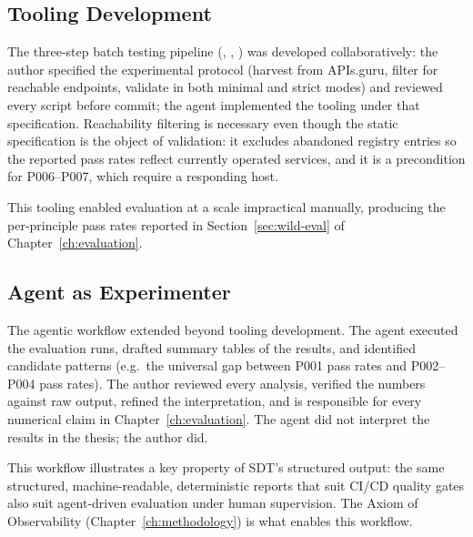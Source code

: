 \subsection{Tooling Development}
\label{subsec:tooling-dev}

The three-step batch testing pipeline (, , ) was developed collaboratively: the author specified the experimental protocol (harvest from APIs.guru, filter for reachable endpoints, validate in both minimal and strict modes) and reviewed every script before commit; the agent implemented the tooling under that specification. Reachability filtering is necessary even though the static specification is the object of validation: it excludes abandoned registry entries so the reported pass rates reflect currently operated services, and it is a precondition for P006--P007, which require a responding host.

This tooling enabled evaluation at a scale impractical manually, producing the per-principle pass rates reported in Section~\ref{sec:wild-eval} of Chapter~\ref{ch:evaluation}.

\subsection{Agent as Experimenter}
\label{subsec:agent-experimenter}

The agentic workflow extended beyond tooling development. The agent executed the evaluation runs, drafted summary tables of the results, and identified candidate patterns (e.g.\ the universal gap between P001 pass rates and P002--P004 pass rates). The author reviewed every analysis, verified the numbers against raw output, refined the interpretation, and is responsible for every numerical claim in Chapter~\ref{ch:evaluation}. The agent did not interpret the results in the thesis; the author did.

This workflow illustrates a key property of SDT's structured output: the same structured, machine-readable, deterministic reports that suit CI/CD quality gates also suit agent-driven evaluation under human supervision. The Axiom of Observability (Chapter~\ref{ch:methodology}) is what enables this workflow.

